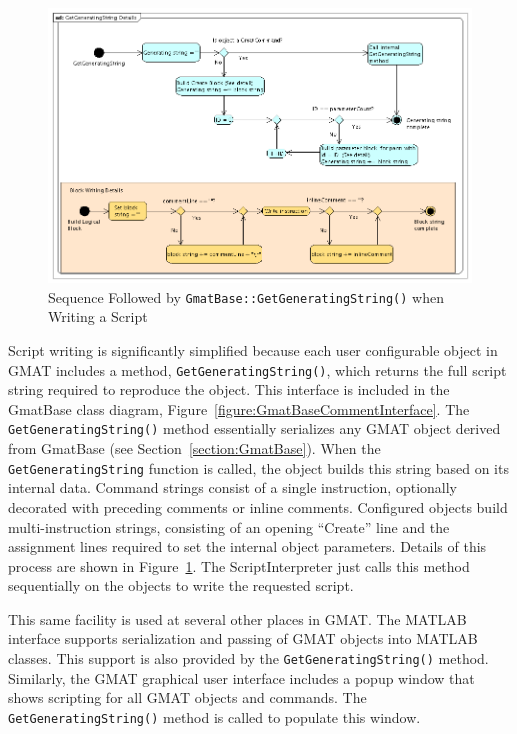 \begin{figure}[htb]
\begin{center}
\includegraphics[400,260]{Images/GetGeneratingStringDetails.png}
\caption{\label{figure:ObjectGetGeneratingString}Sequence Followed by
\texttt{GmatBase::GetGeneratingString()} when Writing a Script}
\end{center}
\end{figure}

Script writing is significantly simplified because each user configurable object in GMAT includes a
method, \texttt{GetGeneratingString()}, which returns the full script string required to reproduce
the object.  This interface is included in the GmatBase class diagram,
Figure~\ref{figure:GmatBaseCommentInterface}.  The \texttt{GetGeneratingString()} method
essentially serializes any GMAT object derived from GmatBase (see
Section~\ref{section:GmatBase}).  When the \texttt{GetGeneratingString} function is called, the
object builds this string based on its internal data.  Command strings consist of a single
instruction, optionally decorated with preceding comments or inline comments.  Configured objects
build multi-instruction strings, consisting of an opening ``Create'' line and the assignment lines
required to set the internal object parameters.  Details of this process are shown in
Figure~\ref{figure:ObjectGetGeneratingString}.  The ScriptInterpreter just calls this method
sequentially on the objects to write the requested script.

This same facility is used at several other places in GMAT.  The MATLAB interface supports
serialization and passing of GMAT objects into MATLAB classes.  This support is also provided by the
\texttt{GetGeneratingString()} method.  Similarly, the GMAT graphical user interface includes a
popup window that shows scripting for all GMAT objects and commands.  The
\texttt{GetGeneratingString()} method is called to populate this window.

